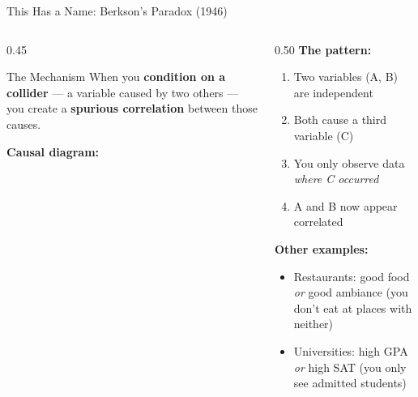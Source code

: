 \documentclass[aspectratio=169,10pt]{beamer}
\begin{document}
\begin{frame}{This Has a Name: Berkson's Paradox (1946)}
\begin{columns}[T]
\begin{column}{0.45\textwidth}
\begin{alertblock}{The Mechanism}
When you \textbf{condition on a collider} --- a variable caused by two others --- you create a \textbf{spurious correlation} between those causes.
\end{alertblock}

\vspace{0.5em}
\textbf{Causal diagram:}
\begin{center}
\end{center}
\end{column}
\begin{column}{0.50\textwidth}
\pause
\textbf{The pattern:}
\begin{enumerate}
    \item Two variables (A, B) are independent
    \item Both cause a third variable (C)
    \item You only observe data \emph{where C occurred}
    \item A and B now appear correlated
\end{enumerate}
\vspace{0.5em}
\pause
\textbf{Other examples:}
\begin{itemize}
    \item Restaurants: good food \emph{or} good ambiance (you don't eat at places with neither)
    \item Universities: high GPA \emph{or} high SAT (you only see admitted students)
\end{itemize}
\end{column}
\end{columns}
\end{frame}
\end{document}
